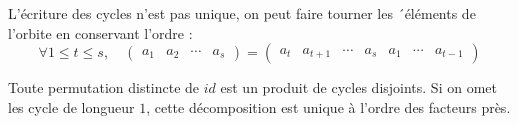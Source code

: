 \begin{remarque}
    L’écriture des cycles n’est pas unique, on peut faire tourner les ´éléments de
l’orbite en conservant l’ordre :
\[
\forall 1\leq t\leq s,\quad \begin{pmatrix}
    a_1&a_2&\cdots&a_s
\end{pmatrix}=\begin{pmatrix}
    a_t&a_{t+1}&\cdots&a_s&a_1&\cdots &a_{t-1}
\end{pmatrix}
\]
\end{remarque}

\begin{proposition}
    Toute permutation distincte de $id$ est un produit de cycles disjoints. Si on omet les cycle de longueur $1$, cette décomposition est unique à l'ordre des facteurs près.
\end{proposition}


